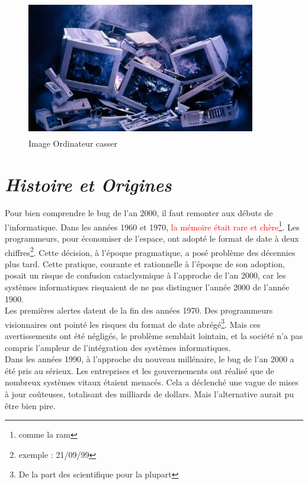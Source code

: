 \documentclass[12pt,a4paper]{article}
\begin{document}
\begin{figure}[H]
    \centering
    \includegraphics[width=10cm, height=6cm]{./images/bug5.jpg}
    \caption{Image Ordinateur casser}
\end{figure}

\newpage
\section{\textit{Histoire et Origines}}

Pour bien comprendre le bug de l'an 2000, il faut remonter aux débuts de l'informatique. Dans les années 1960 et 1970, \textcolor{red}{ la mémoire était rare et chère\footnote{comme la ram}}. Les programmeurs, pour économiser de l'espace, ont adopté le format de date à deux chiffres\footnote{exemple : 21/09/99}. Cette décision, à l'époque pragmatique, a posé problème des décennies plus tard. Cette pratique, courante et rationnelle à l'époque de son adoption, posait un risque de confusion cataclysmique à l'approche de l'an 2000, car les systèmes informatiques risquaient de ne pas distinguer l'année 2000 de l'année 1900. \\

Les premières alertes datent de la fin des années 1970. Des programmeurs visionnaires ont pointé les risques du format de date abrégé\footnote{De la part des scientifique pour la plupart}. Mais ces avertissements ont été négligés, le problème semblait lointain, et la société n'a pas compris l'ampleur de l'intégration des systèmes informatiques.\\

Dans les années 1990, à l'approche du nouveau millénaire, le bug de l'an 2000 a été pris au sérieux. Les entreprises et les gouvernements ont réalisé que de nombreux systèmes vitaux étaient menacés. Cela a déclenché une vague de mises à jour coûteuses, totalisant des milliards de dollars. Mais l'alternative aurait pu être bien pire.
\cite{ina}
\end{document}
